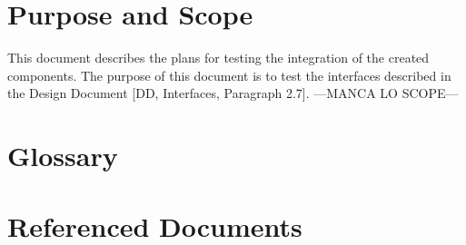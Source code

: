 \section{Purpose and Scope}
This document describes the plans for testing the integration of the created components. The purpose of this document is to test the interfaces described in the Design Document [DD, Interfaces, Paragraph 2.7]. 
---MANCA LO SCOPE---

\section{Glossary}
\section{Referenced Documents}





